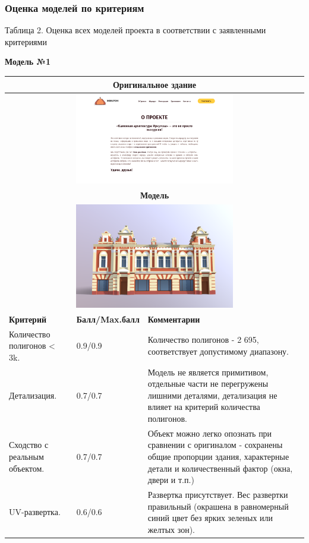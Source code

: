 \subsubsection*{Оценка моделей по критериям}

\begin{center}
    Таблица 2. Оценка всех моделей проекта в соответствии с заявленными критериями
\end{center}

\begin{center}
    \textbf{Модель №1}
\end{center}

\begin{longtable}{|l|l|l|}
    \hline
    \multicolumn{3}{|c|}{\textbf{Оригинальное здание} } \\
    \hline
    \multicolumn{3}{|c|}{\includegraphics[width=7cm]{1}} \\
    \hline
    \multicolumn{3}{|c|}{\textbf{Модель}} \\
    \hline
    \multicolumn{3}{|c|}{\includegraphics[width=7cm]{model_1}} \\
    \hline
    \textbf{Критерий} & \textbf{Балл/Max.балл} & \textbf{Комментарии} \\
    \hline
    Количество полигонов < 3k. & 0.9/0.9 & Количество полигонов - 2 695, соответствует допустимому диапазону. \\
    \hline
    Детализация. & 0.7/0.7 & Модель не является примитивом, отдельные части не перегружены лишними деталями, детализация не влияет на критерий количества полигонов. \\
    \hline
    Сходство с реальным объектом. & 0.7/0.7 & Объект можно легко опознать при сравнении с оригиналом - сохранены общие пропорции здания, характерные детали и количественный фактор (окна, двери и т.п.) \\
    \hline
    UV-развертка. & 0.6/0.6 & Развертка присутствует. Вес развертки правильный (окрашена в равномерный синий цвет без ярких зеленых или желтых зон).


\end{longtable}
